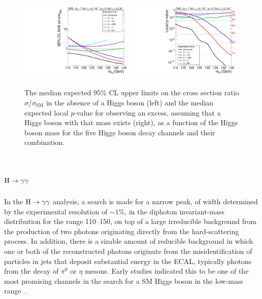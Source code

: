 \documentclass[12pt,twoside,a4paper,cmspaper,final,collab]{cms-tdr}
\begin{document}
\begin{figure}
\centering
\includegraphics[width=0.49\textwidth]{figures/comb/sqr_acls_allexp_bydecay_smallGGScale} \hfill
\includegraphics[width=0.49\textwidth]{figures/comb/sqr_pvala_allexp_bydecay_smallGGScale_wideX}
\caption{ The median expected 95\% CL upper limits on the cross section ratio
$ \sigma / \sigma_{\mathrm{SM}}$ in the absence of a Higgs boson
(left) and the median expected local $p$-value for observing an excess,
assuming that a Higgs boson with that mass exists (right),
as a function of the Higgs boson mass for the five Higgs boson decay channels and their combination.
}
\label{fig:sensitivity}
\end{figure}




\section{\texorpdfstring{$\mathrm{H}\to\gamma\gamma$}{H to gamma gamma}\label{sec:hgg}}

In the $\mathrm{H}\to\gamma\gamma$ analysis, a search is made for a narrow peak,
of width determined by the experimental resolution of ${\sim}1\%$,
in the diphoton
invariant-mass distribution for the range 110--150\GeV,
on top of a large irreducible background
from the production of two photons originating directly from the hard-scattering process.
In addition, there is a sizable amount of reducible background in which one or both
of the reconstructed photons originate from the misidentification of
particles  in jets that deposit substantial energy in the ECAL, typically photons from
the decay of $\pi^0$ or $\eta$ mesons.
Early studies indicated this to be one of the most promising channels
in the search for a SM Higgs boson in the low-mass range~\cite{Seez1990a}.
\end{document}
